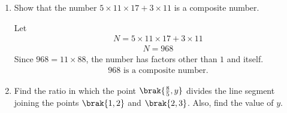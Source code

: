 \begin{enumerate}[label=\thesubsection.\arabic*, ref=\thesubsection.\theenumi]
\solution
Let us assume that \(5-2\sqrt{3}\) is rational.

Then,
\begin{align}
5-2\sqrt{3}=r
\end{align}
where \(r\) is a rational number.

Rearranging,
\begin{align}
2\sqrt{3}=5-r
\end{align}
\begin{align}
\sqrt{3}=\frac{5-r}{2}
\end{align}

Since \(5\), \(r\), and \(2\) are rational numbers, \(\dfrac{5-r}{2}\) is also rational.

This contradicts the given fact that \(\sqrt{3}\) is irrational.
\begin{align}
 5-2\sqrt{3}\text{ is irrational.}
\end{align}
\begin{align}
\text{Hence proved.}
\end{align}

\item
Show that the number \(5\times11\times17+3\times11\) is a composite number.

\solution
Let
\begin{align}
N=5\times11\times17+3\times11
\end{align}
\begin{align}
N=968
\end{align}
Since \(968=11\times88\), the number has factors other than \(1\) and itself.
\begin{align}
 968\text{ is a composite number.}
\end{align}

\item
 Find the ratio in which the point \(\brak{\frac{8}{5},y}\) divides the line segment joining the points \(\brak{1,2}\) and \(\brak{2,3}\). Also, find the value of \(y\).


\end{enumerate}
